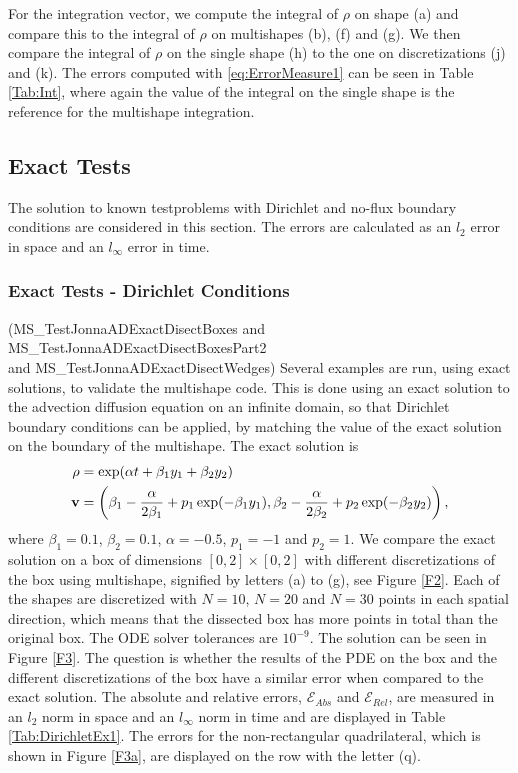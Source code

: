 For the integration vector, we compute the integral of $\rho$ on shape (a) and compare this to the integral of $\rho$ on multishapes (b), (f) and (g). We then compare the integral of $\rho$ on the single shape (h) to the one on discretizations (j) and (k). The errors computed with \eqref{eq:ErrorMeasure1} can be seen in Table \ref{Tab:Int}, where again the value of the integral on the single shape is the reference for the multishape integration.










\subsection{Exact Tests}
The solution to known testproblems with Dirichlet and no-flux boundary conditions are considered in this section. The errors are calculated as an $l_2$ error in space and an $l_\infty$ error in time.
\subsubsection{Exact Tests - Dirichlet Conditions}
(MS\_TestJonnaADExactDisectBoxes and MS\_TestJonnaADExactDisectBoxesPart2\\ and MS\_TestJonnaADExactDisectWedges)
Several examples are run, using exact solutions, to validate the multishape code. This is done using an exact solution to the advection diffusion equation on an infinite domain, so that Dirichlet boundary conditions can be applied, by matching the value of the exact solution on the boundary of the multishape.
The exact solution is \cite{Hutomo_2019}
\begin{align}\label{eq:DirichletExactSol}
	\rho &= \exp(\alpha t + \beta_1 y_1 + \beta_2 y_2)\\
	\mathbf v &= \left(\beta_1 - \frac{\alpha}{2 \beta_1} + p_1\exp(-\beta_1 y_1) , \beta_2 - \frac{\alpha}{2 \beta_2} + p_2\exp(-\beta_2 y_2) \right),\notag
\end{align}
where $\beta_1 = 0.1$, $\beta_2 = 0.1$, $\alpha = -0.5$, $p_1 = -1$ and $p_2 = 1$.
We compare the exact solution on a box of dimensions $[0,2] \times [0,2] $ with different discretizations of the box using multishape, signified by letters (a) to (g), see Figure \ref{F2}. Each of the shapes are discretized with $N = 10$, $N = 20$ and $N = 30$ points in each spatial direction, which means that the dissected box has more points in total than the original box. The ODE solver tolerances are $10^{-9}$. The solution can be seen in Figure \ref{F3}. The question is whether the results of the PDE on the box and the different discretizations of the box have a similar error when compared to the exact solution. The absolute and relative errors, $\mathcal E_{Abs}$ and $\mathcal E_{Rel}$, are measured in an $l_2$ norm in space and an $l_\infty$ norm in time and are displayed in Table \ref{Tab:DirichletEx1}. The errors for the non-rectangular quadrilateral, which is shown in Figure \ref{F3a}, are displayed on the row with the letter (q). 


